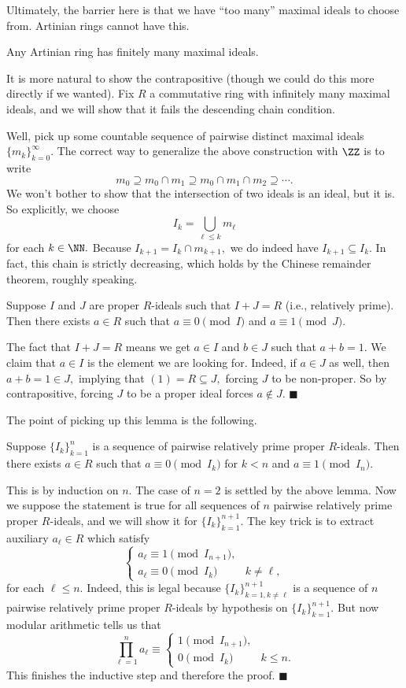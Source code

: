 Ultimately, the barrier here is that we have ``too many'' maximal ideals to choose from. Artinian rings cannot have this.
\begin{proposition}
    Any Artinian ring has finitely many maximal ideals.
\end{proposition}
It is more natural to show the contrapositive (though we could do this more directly if we wanted). Fix $R$ a commutative ring with infinitely many maximal ideals, and we will show that it fails the descending chain condition.

Well, pick up some countable sequence of pairwise distinct maximal ideals $\{m_k\}_{k=0}^\infty.$ The correct way to generalize the above construction with $\ZZ$ is to write
\[m_0\supseteq m_0\cap m_1\supseteq m_0\cap m_1\cap m_2\supseteq\cdots.\]
We won't bother to show that the intersection of two ideals is an ideal, but it is. So explicitly, we choose
\[I_k=\bigcup_{\ell\le k}m_\ell\]
for each $k\in\NN.$ Because $I_{k+1}=I_k\cap m_{k+1},$ we do indeed have $I_{k+1}\subseteq I_k.$ In fact, this chain is strictly decreasing, which holds by the Chinese remainder theorem, roughly speaking.
\begin{lemma}
    Suppose $I$ and $J$ are proper $R$-ideals such that $I+J=R$ (i.e., relatively prime). Then there exists $a\in R$ such that $a\equiv0\pmod I$ and $a\equiv1\pmod J.$
\end{lemma}
The fact that $I+J=R$ means we get $a\in I$ and $b\in J$ such that $a+b=1.$ We claim that $a\in I$ is the element we are looking for. Indeed, if $a\in J$ as well, then $a+b=1\in J,$ implying that $(1)=R\subseteq J,$ forcing $J$ to be non-proper. So by contrapositive, forcing $J$ to be a proper ideal forces $a\not\in J.$ $\blacksquare$

The point of picking up this lemma is the following.
\begin{lemma}
    Suppose $\{I_k\}_{k=1}^n$ is a sequence of pairwise relatively prime proper $R$-ideals. Then there exists $a\in R$ such that $a\equiv0\pmod{I_k}$ for $k<n$ and $a\equiv1\pmod{I_n}.$
\end{lemma}
This is by induction on $n.$ The case of $n=2$ is settled by the above lemma. Now we suppose the statement is true for all sequences of $n$ pairwise relatively prime proper $R$-ideals, and we will show it for $\{I_k\}_{k=1}^{n+1}.$ The key trick is to extract auxiliary $a_\ell\in R$ which satisfy
\[\begin{cases}
    a_\ell\equiv1\pmod{I_{n+1}}, \\
    a_\ell\equiv0\pmod{I_k} & k\ne\ell,
\end{cases}\]
for each $\ell\le n.$ Indeed, this is legal because $\{I_k\}_{k=1,k\ne\ell}^{n+1}$ is a sequence of $n$ pairwise relatively prime proper $R$-ideals by hypothesis on $\{I_k\}_{k=1}^{n+1}.$ But now modular arithmetic tells us that
\[\prod_{\ell=1}^na_\ell\equiv\begin{cases}
    1\pmod{I_{n+1}}, \\
    0\pmod{I_k} & k\le n.
\end{cases}\]
This finishes the inductive step and therefore the proof. $\blacksquare$

